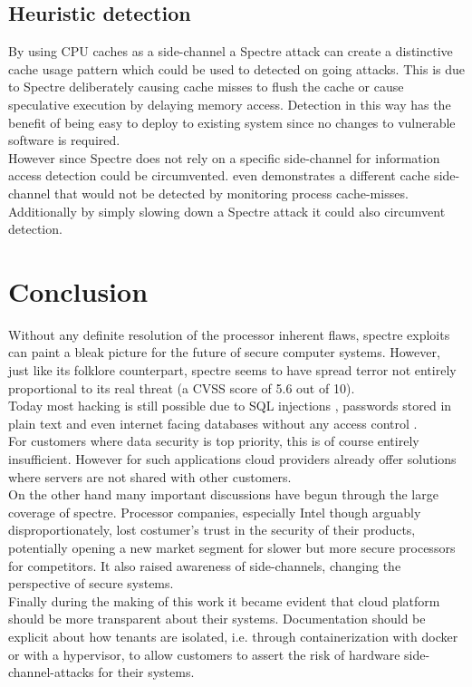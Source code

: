 \documentclass[conference,compsoc,final,a4paper]{IEEEtran}
\begin{document}
\subsection{Heuristic detection}
By using CPU caches as a side-channel a Spectre attack can create a distinctive cache usage pattern which could be used to detected on going attacks. \cite{depoix2018}
This is due to Spectre deliberately causing cache misses to flush the cache or cause speculative execution by delaying memory access. Detection in this way has the
benefit of being easy to deploy to existing system since no changes to vulnerable software is required. \cite{depoix2018, chiappetta2016real} \\
However since Spectre does not rely on a specific side-channel for information access \cite{kocher2018spectre} detection could be circumvented. \textcite{gruss2016flush+}
even demonstrates a different cache side-channel that would not be detected by monitoring process cache-misses. \\
Additionally by simply slowing down a Spectre attack it could also circumvent detection. \cite{chiappetta2016real}
\section{Conclusion}
Without any definite resolution of the processor inherent flaws, spectre exploits can paint a bleak picture for the future of secure computer systems. However, just like its folklore counterpart, spectre seems to have spread terror not entirely proportional to its real threat (a CVSS score of 5.6 out of 10)\cite{cveSpectre}. \\
Today most hacking is still possible due to SQL injections \cite{magnetoSQLi}, passwords stored in plain text \cite{facebookPlainText} and even internet facing databases without any access control \cite{unistellarMongoDB}. \\
For customers where data security is top priority, this is of course entirely insufficient. However for such applications cloud providers already offer solutions where servers are not shared with other customers. \cite{AWSDedicated} \\
On the other hand many important discussions have begun through the large coverage of spectre. Processor companies, especially Intel though arguably disproportionately, lost costumer's trust in the security of their products, potentially opening a new market segment for slower but more secure processors for competitors. It also raised awareness of side-channels, changing the perspective of secure systems. \\
Finally during the making of this work it became evident that cloud platform should be more transparent about their systems. Documentation should be explicit about how tenants are isolated, i.e. through containerization with docker or with a hypervisor, to allow customers to assert the risk of hardware side-channel-attacks for their systems.
\end{document}
